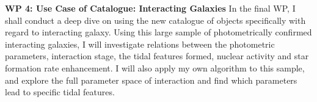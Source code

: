 \documentclass[11pt,usenatbib]{article}
\begin{document}
\noindent \textbf{WP 4: Use Case of Catalogue: Interacting Galaxies} In the final WP, I shall conduct a deep dive on using the new catalogue of objects specifically with regard to interacting galaxy. Using this large sample of photometrically confirmed interacting galaxies, I will investigate relations between the photometric parameters, interaction stage, the tidal features formed, nuclear activity and star formation rate enhancement. I will also apply my own algorithm to this sample, and explore the full parameter space of interaction and find which parameters lead to specific tidal features.
\\
\\


\end{document}
